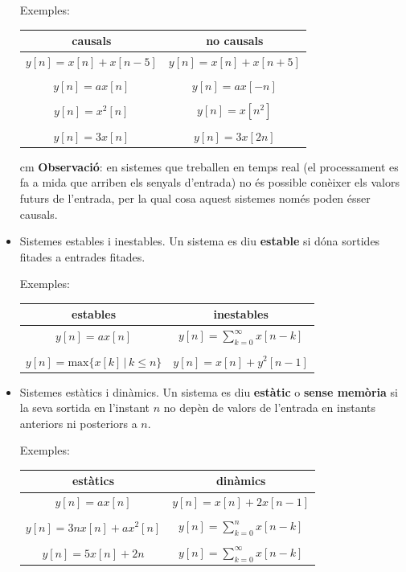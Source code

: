 \documentclass{article}
\begin{document}
\begin{itemize}
\noindent
Exemples:
\begin{center}
\begin{tabular}{|c|c|}
 causals & no causals \\ \hline
$y[n]=x[n]+x[n-5]$ & $y[n]=x[n]+x[n+5]$ \\ & \\
$y[n]=ax[n]$  & $y[n]=ax[-n]$ \\ & \\
$y[n]=x^2[n]$ & $y[n]=x[n^2]$ \\ & \\
$y[n]=3x[n]$ & $y[n]=3x[2n]$
\end{tabular}
\end{center}

 cm
\noindent
\textbf{Observaci\'o}: en sistemes que treballen en temps real 
(el processament es fa a mida que arriben els senyals d'entrada)
no \'es possible con\`eixer els valors futurs de l'entrada, per la qual cosa 
aquest sistemes nom\'es poden \'esser causals.

\item Sistemes estables i inestables.
Un sistema es diu \textbf{estable} si d\'ona sortides fitades a
entrades fitades.

\noindent
Exemples:
\begin{center}
\begin{tabular}{|c|c|}
 estables & inestables \\ \hline
$y[n]=ax[n]$ & $y[n]=\sum_{k=0}^\infty x[n-k]$ \\ & \\
$y[n]=\mathrm{max}\{ x[k] \, | \, k \leq n \}$  & $y[n]=x[n]+y^2[n-1]$ 
\end{tabular}
\end{center}


\item Sistemes est\`atics i din\`amics.
Un sistema es diu \textbf{est\`atic} o \textbf{sense mem\`oria} si la
seva sortida en l'instant $n$ no dep\`en de valors de l'entrada en instants
anteriors ni posteriors a $n$.

\noindent
Exemples:
\begin{center}
\begin{tabular}{|c|c|}
 est\`atics & din\`amics \\ \hline
$y[n]=ax[n]$ & $y[n]=x[n]+2x[n-1]$ \\ & \\
$y[n]=3nx[n]+ax^2[n]$ & $y[n]=\sum_{k=0}^n x[n-k]$ \\ & \\
$y[n]=5x[n]+2n$ & $y[n]=\sum_{k=0}^\infty x[n-k]$
\end{tabular}
\end{center}

\end{itemize}
\end{document}

